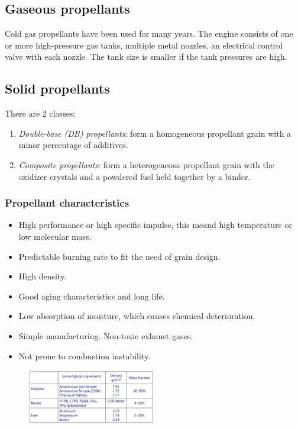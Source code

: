 \documentclass[12pt]{article}
\begin{document}
\subsection{Gaseous propellants}

Cold gas propellants have been used for many years. The engine consists of one or more high-pressure gas tanks, multiple metal nozzles, an electrical control valve with each nozzle. The tank size is smaller if the tank pressures are high.

\subsection{Solid propellants}

There are 2 classes:

\begin{enumerate}
    \item \textit{Double-base (DB) propellants}: form a homogeneous propellant grain with a minor percentage of additives.
    \item \textit{Composite propellants}: form a heterogeneous propellant grain with the oxidizer crystals and a powdered fuel held together by a binder.
\end{enumerate}

\subsubsection{Propellant characteristics}

\begin{itemize}
    \item High performance or high specific impulse, this meand high temperature or low molecular mass.
    \item Predictable burning rate to fit the need of grain design.
    \item High density.
    \item Good aging characteristics and long life.
    \item Low absorption of moisture, which causes chemical deterioration.
    \item Simple manufacturing. Non-toxic exhaust gases.
    \item Not prone to combustion instability.
\end{itemize}

\begin{figure}[h!]
\centering
\includegraphics[width=0.5\textwidth]{figures/table.png}
\end{figure}
\end{document}
